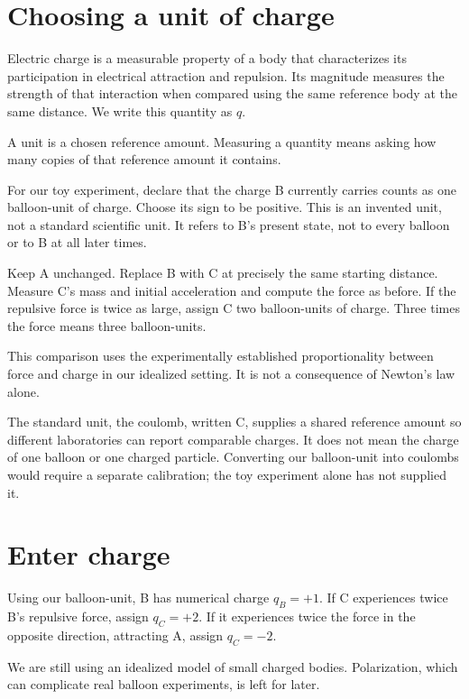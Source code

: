 \section{Choosing a unit of charge}

Electric charge is a measurable property
of a body that characterizes its
participation in electrical attraction
and repulsion. Its magnitude measures
the strength of that interaction when
compared using the same reference body
at the same distance. We write this
quantity as $q$.

A unit is a chosen reference amount.
Measuring a quantity means asking how
many copies of that reference amount
it contains.

For our toy experiment, declare that
the charge B currently carries counts
as one balloon-unit of charge.
Choose its sign to be positive.
This is an invented unit, not a
standard scientific unit. It refers
to B's present state, not to every
balloon or to B at all later times.

Keep A unchanged. Replace B with C
at precisely the same starting distance.
Measure C's mass and initial acceleration
and compute the force as before.
If the repulsive force is twice as
large, assign C two balloon-units of
charge. Three times the force means
three balloon-units.

This comparison uses the experimentally
established proportionality between
force and charge in our idealized
setting. It is not a consequence of
Newton's law alone.

The standard unit, the coulomb, written
$\mathrm C$, supplies a shared reference
amount so different laboratories can
report comparable charges. It does not
mean the charge of one balloon or one
charged particle. Converting our
balloon-unit into coulombs would require
a separate calibration; the toy
experiment alone has not supplied it.

\section{Enter charge}

Using our balloon-unit, B has numerical
charge $q_B=+1$. If C experiences twice
B's repulsive force, assign $q_C=+2$.
If it experiences twice the force in
the opposite direction, attracting A,
assign $q_C=-2$.

We are still using an idealized model
of small charged bodies. Polarization,
which can complicate real balloon
experiments, is left for later.

